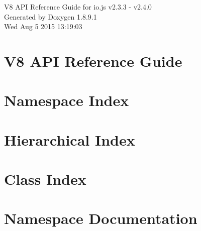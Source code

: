 \documentclass[twoside]{book}
\newcommand{\+}{\discretionary{\mbox{\scriptsize$\hookleftarrow$}}{}{}}
\newcommand{\clearemptydoublepage}{%
  \newpage{\pagestyle{empty}\cleardoublepage}%
}
\begin{document}
\hypersetup{pageanchor=false,
             bookmarks=true,
             bookmarksnumbered=true,
             pdfencoding=unicode
            }
\begin{titlepage}
\vspace*{7cm}
\begin{center}%
{\Large V8 A\+P\+I Reference Guide for io.\+js v2.3.3 -\/ v2.4.0 }\\
\vspace*{1cm}
{\large Generated by Doxygen 1.8.9.1}\\
\vspace*{0.5cm}
{\small Wed Aug 5 2015 13:19:03}\\
\end{center}
\end{titlepage}
\clearemptydoublepage
\tableofcontents
\clearemptydoublepage
{}
\hypersetup{pageanchor=true}

\chapter{V8 A\+P\+I Reference Guide}
\label{index}\hypertarget{index}{}
\chapter{Namespace Index}

\chapter{Hierarchical Index}

\chapter{Class Index}

\chapter{Namespace Documentation}

\end{document}
